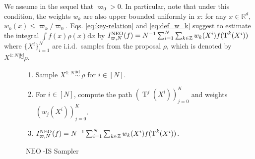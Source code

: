 \documentclass{article}
\def\simiid{\overset{\operatorname{iid}}{\sim}}
\def\IFIS{\ensuremath{\operatorname{NEO}}}
\def\InFiNE{{\small \IFIS}}
\def\NEO{{\small \IFIS}}
\def\transfo{\operatorname{T}}
\def\rmd{\operatorname{d}\hspace{-2pt}}
\def\iid{i.i.d.}
\def\rset{\mathbb{R}}
\def\rmd{\mathrm{d}}
\newcommand{\1}{\mathds{1}}
\def\iid{i.i.d.}
\def\proposal{\rho}
\newcommand{\chunku}[3]{#1^{#2:#3}}
\newcommand{\intentierU}[1]{[#1]}
\def\rset{\mathbb{R}}
\def\zset{\mathbb{Z}}
\def\rmd{\mathrm{d}}
\def\infineIS{I^{\NEO}_{\varpi,N}}
\begin{document}
We assume in the sequel that $\varpi_0>0$. In particular, note that under this condition, the weights $w_{k}$ are also upper bounded uniformly in $x$: for any $x \in \rset^d$,  $w_{k}(x) \leq \varpi_{k}/\varpi_{0}$. Eqs. \eqref{eq:key-relation} and \eqref{eq:def_w_k} suggest to estimate the integral $\int f(x) \rho(x) \rmd x$ by $\infineIS(f)= N^{-1} \sum_{i=1}^N \sum_{k\in\zset} w_k(X^i)  f(\transfo^k(X^i))$ where $\{X^i\}_{i=1}^N$ are \iid\ samples from the proposal $\rho$, which is denoted by $\chunku{X}{1}{N} \simiid \proposal$. 
\begin{figure}
\begin{algorithm}[H]
\begin{enumerate}[leftmargin=0cm,itemindent=.5cm,labelwidth=\itemindent,labelsep=0cm,align=left]
\item Sample $\chunku{X}{1}{N} \simiid \ \rho$ for $i\in[N]$.
\item For $i \in \intentierU{N}$, compute the
  path $(\transfo^j(X^i))_{j =0}^K$ and weights $(w_j(X^i))_{j =0}^K$.
\item$\infineIS(f) = N^{-1} \sum_{i=1}^N \sum_{k\in\zset} w_k(X^i)  f(\transfo^k(X^i))$.
\end{enumerate}
\caption{\InFiNE-IS Sampler}
\label{algo:infine_partial}
\end{algorithm}
\end{figure}
\end{document}
